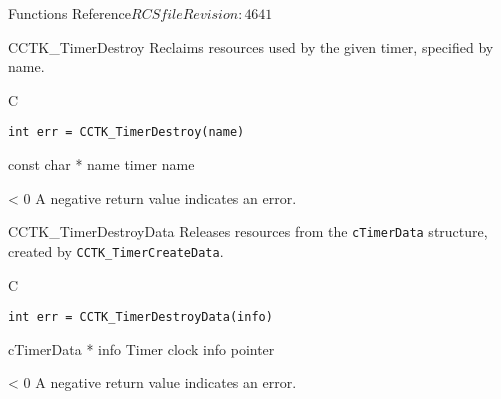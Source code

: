\begin{cactuspart}{ Functions Reference}{$RCSfile$}{$Revision: 4641 $}
\begin{FunctionDescription}{CCTK\_TimerDestroy}
\label{CCTK-TimerDestroy}
Reclaims resources used by the
given timer, specified by name.
\begin{SynopsisSection}
\begin{Synopsis}{C}
\begin{verbatim}
int err = CCTK_TimerDestroy(name)
\end{verbatim}
\end{Synopsis}
\end{SynopsisSection}

\begin{ParameterSection}
\begin{Parameter} {const char * name}
timer name
\end{Parameter}
\end{ParameterSection}

\begin{ErrorSection}
\begin{Error}{< 0}
A negative return value indicates an error.
\end{Error}
\end{ErrorSection}
\end{FunctionDescription}


\begin{FunctionDescription}{CCTK\_TimerDestroyData}
\label{CCTK-TimerDestroyData}
Releases resources from the {\tt cTimerData}
structure, created by {\tt CCTK\_TimerCreateData}.
\begin{SynopsisSection}
\begin{Synopsis}{C}
\begin{verbatim}
int err = CCTK_TimerDestroyData(info)
\end{verbatim}
\end{Synopsis}
\end{SynopsisSection}

\begin{ParameterSection}
\begin{Parameter} {cTimerData * info}
Timer clock info pointer
\end{Parameter}
\end{ParameterSection}

\begin{ErrorSection}
\begin{Error}{< 0}
A negative return value indicates an error.
\end{Error}
\end{ErrorSection}
\end{FunctionDescription}



\end{cactuspart}
